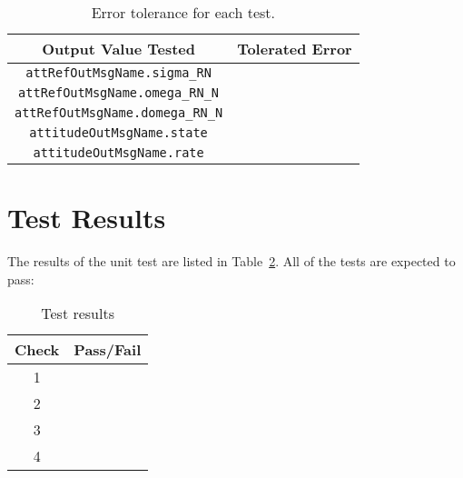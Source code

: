 \begin{table}[htbp]
	\caption{Error tolerance for each test.}
	\label{tab:errortol}
	\centering \fontsize{10}{10}\selectfont
	\begin{tabular}{ c | c } %
		\hline\hline
		\textbf{Output Value Tested}  & \textbf{Tolerated Error}  \\ 
		\hline
		{\tt attRefOutMsgName.sigma\_RN}        & 	   \\ 
		{\tt attRefOutMsgName.omega\_RN\_N}        & 	   \\ 
		{\tt attRefOutMsgName.domega\_RN\_N}        & 	   \\ 
		{\tt attitudeOutMsgName.state}        & 	   \\ 
		{\tt attitudeOutMsgName.rate}        & 	   \\ 
		\hline\hline
	\end{tabular}
\end{table}




\section{Test Results}
The results of the unit test are listed in Table~\ref{tab:results}.  
All of the tests are expected to pass:
\begin{table}[H]
	\caption{Test results}
	\label{tab:results}
	\centering \fontsize{10}{10}\selectfont
	\begin{tabular}{c | c  } %
		\hline\hline
		\textbf{Check} 						  		&\textbf{Pass/Fail} \\ 
		\hline
	   1	   			&  \\ 
	   2	   			&  \\ 
	   3	   			&  \\ 
	   4	   			&  \\ 
	   \hline\hline
	\end{tabular}
\end{table}


